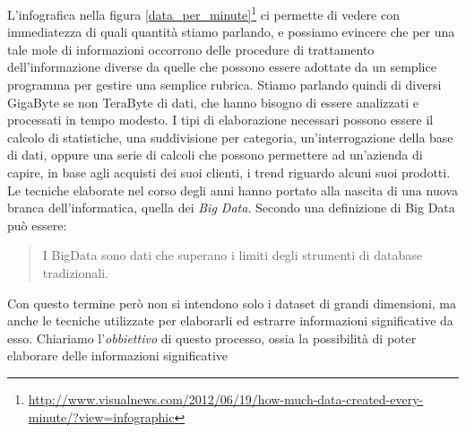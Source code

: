L'infografica nella figura \ref{data_per_minute}\footnote{\url{http://www.visualnews.com/2012/06/19/how-much-data-created-every-minute/?view=infographic}} ci permette di vedere con immediatezza di quali quantità stiamo parlando, e possiamo evincere che per una tale mole di informazioni occorrono delle procedure di trattamento dell'informazione diverse da quelle che possono essere adottate da un semplice programma per gestire una semplice rubrica. Stiamo parlando quindi di diversi GigaByte se non TeraByte di dati, che hanno bisogno di essere analizzati e processati in tempo modesto. I tipi di elaborazione necessari possono essere il calcolo di statistiche, una suddivisione per categoria, un'interrogazione della base di dati, oppure una serie di calcoli che possono permettere ad un'azienda di capire, in base agli acquisti dei suoi clienti, i trend riguardo alcuni suoi prodotti. Le tecniche elaborate nel corso degli anni hanno portato alla nascita di una nuova branca dell'informatica, quella dei \emph{Big Data}. Secondo \cite{rezzani2013big} una definizione di Big Data può essere:
\begin{quotation}
I BigData sono dati che superano i limiti degli strumenti di database tradizionali.
\end{quotation}
Con questo termine però non si intendono solo i dataset di grandi dimensioni, ma anche le tecniche utilizzate per elaborarli ed estrarre informazioni significative da esso.
Chiariamo l'\emph{obbiettivo} di questo processo, ossia la possibilità di poter elaborare delle informazioni significative 